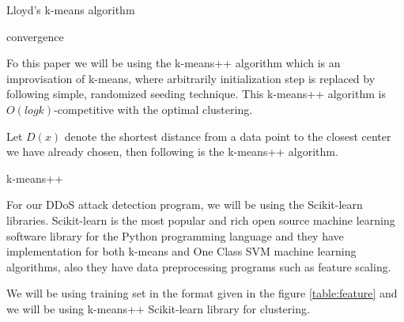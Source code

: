 \documentclass[10pt,oneside,a4paper]{article}
\begin{document}
\begin{algorithm}
\caption{Lloyd's k-means algorithm}\label{k-means}
\begin{algorithmic}
\Repeat
  \EndFor
  \EndFor
\Until convergence
\end{algorithmic}
\end{algorithm}

Fo this paper we will be using the k-means++ algorithm\cite{k-means++} which is an improvisation of k-means, where arbitrarily initialization step is replaced by following simple, randomized seeding technique. This k-means++ algorithm is $O(log k)$-competitive with the optimal clustering.

Let $D(x)$ denote the shortest distance from a data point to the closest center we have already chosen, then following is the k-means++ algorithm.

\begin{algorithm}
\caption{k-means++}\label{k-means++}
\begin{algorithmic}[1]
\end{algorithmic}
\end{algorithm}

For our DDoS attack detection program, we will be using the Scikit-learn libraries. Scikit-learn is the most popular and rich open source machine learning software library for the Python programming language and they have implementation for both k-means and One Class SVM machine learning algorithms, also they have data preprocessing programs such as feature scaling.

We will be using training set in the format given in the figure \ref{table:feature} and we will be using k-means++ Scikit-learn library for clustering.
\end{document}
